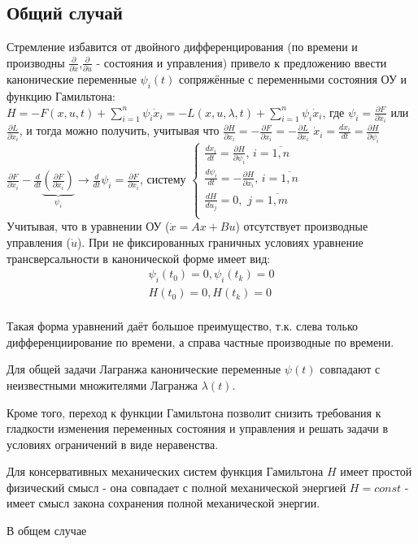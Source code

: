 \documentclass[preprint,russian,a5paper,10pt,twoside,mediummath]{ncc}
\begin{document}
\subsection{Общий случай\label{variations:Canonical_Euler}}
Стремление избавится от двойного дифференцирования (по времени и производны  $\frac{\partial }{\partial \dot{x}}$,$\frac{\partial }{\partial \dot{u}}$ - состояния и управления) привело к предложению ввести канонические переменные ${{\psi }_{i}}\left( t \right)$ сопряжённые с переменными состояния ОУ и функцию Гамильтона: $H=-F\left( x,u,t \right)+\sum\limits_{i=1}^{n}{{{\psi }_{i}}{{{\dot{x}}}_{i}}}=-L\left( x,u,\lambda ,t \right)+\sum\limits_{i=1}^{n}{{{\psi }_{i}}{{{\dot{x}}}_{i}}}$, где ${{\psi }_{i}}=\frac{\partial F}{\partial {{{\dot{x}}}_{i}}}$ или $\frac{\partial L}{\partial {{{\dot{x}}}_{i}}}$, и тогда можно получить, учитывая что $\frac{\partial H}{\partial {{x}_{i}}}=-\frac{\partial F}{\partial {{x}_{i}}}=-\frac{\partial L}{\partial {{x}_{i}}}$ ${{\dot{x}}_{i}}=\frac{d{{{\dot{x}}}_{i}}}{dt}=\frac{\partial H}{\partial {{\psi }_{i}}}$ $\frac{\partial F}{\partial {{x}_{i}}}-\frac{d}{dt}\underbrace{\left( \frac{\partial F}{\partial {{{\dot{x}}}_{i}}} \right)}_{{{\psi }_{i}}}\to \frac{d}{dt}{{\psi }_{i}}=\frac{\partial F}{\partial {{x}_{i}}}$, систему
$\left\{ \begin{array}{*{35}{l}}
   \frac{d{{x}_{i}}}{dt}=\frac{\partial H}{\partial {{\psi }_{i}}},\,i=\overline{1,n}  \\
   \frac{d{{\psi }_{i}}}{dt}=-\frac{\partial H}{\partial {{x}_{i}}},\,i=\overline{1,n}  \\
   \frac{dH}{d{{u}_{j}}}=0,\,\,j=\overline{1,m}  \\
\end{array} \right.$
\\Учитывая, что в уравнении ОУ ($\dot{x}=Ax+Bu$) отсутствует производные управления ($\dot{u}$). При не фиксированных граничных условиях уравнение трансверсальности в канонической форме имеет вид: 
\[\begin{array}{*{35}{l}}
   {{\psi }_{i}}\left( {{t}_{0}} \right)=0,{{\psi }_{i}}\left( {{t}_{k}} \right)=0  \\
   H\left( {{t}_{0}} \right)=0,H\left( {{t}_{k}} \right)=0  \\
\end{array}\]
\par Такая форма уравнений даёт большое преимущество, т.к. слева только дифференциирование по времени, а справа частные производные по времени.
\par Для общей задачи Лагранжа канонические переменные $\psi \left( t \right)$ совпадают с неизвестными множителями Лагранжа $\lambda \left( t \right)$.
\par Кроме того, переход к функции Гамильтона позволит снизить требования к гладкости изменения переменных состояния и управления и решать задачи в условиях ограничений в виде неравенства.
\par Для консервативных механических систем функция Гамильтона $H$ имеет простой физический смысл - она совпадает с полной механической энергией $H=const$ - имеет смысл закона сохранения полной механической энергии.
\par В общем случае 
\clearpage
\end{document}
